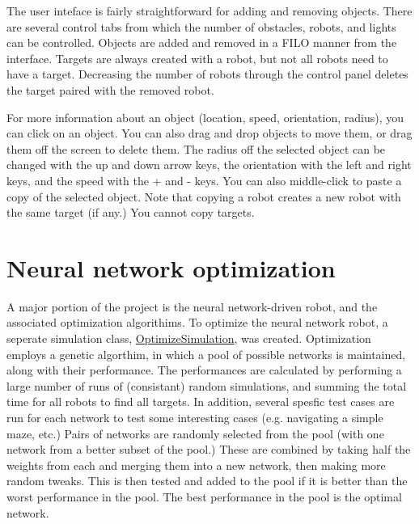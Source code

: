 The user inteface is fairly straightforward for adding and removing objects. There are several control tabs from which the number of obstacles, robots, and lights can be controlled. Objects are added and removed in a F\-I\-L\-O manner from the interface. Targets are always created with a robot, but not all robots need to have a target. Decreasing the number of robots through the control panel deletes the target paired with the removed robot.

For more information about an object (location, speed, orientation, radius), you can click on an object. You can also drag and drop objects to move them, or drag them off the screen to delete them. The radius off the selected object can be changed with the up and down arrow keys, the orientation with the left and right keys, and the speed with the + and -\/ keys. You can also middle-\/click to paste a copy of the selected object. Note that copying a robot creates a new robot with the same target (if any.) You cannot copy targets.\hypertarget{index_Optimization}{}\section{Neural network optimization}\label{index_Optimization}
A major portion of the project is the neural network-\/driven robot, and the associated optimization algorithims. To optimize the neural network robot, a seperate simulation class, \hyperlink{classOptimizeSimulation}{Optimize\-Simulation}, was created. Optimization employs a genetic algorthim, in which a pool of possible networks is maintained, along with their performance. The performances are calculated by performing a large number of runs of (consistant) random simulations, and summing the total time for all robots to find all targets. In addition, several spesfic test cases are run for each network to test some interesting cases (e.\-g. navigating a simple maze, etc.) Pairs of networks are randomly selected from the pool (with one network from a better subset of the pool.) These are combined by taking half the weights from each and merging them into a new network, then making more random tweaks. This is then tested and added to the pool if it is better than the worst performance in the pool. The best performance in the pool is the optimal network.

